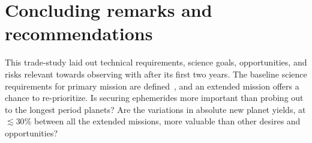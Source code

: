 \section{Concluding remarks and recommendations}
\label{sec:conclusions}

This trade-study laid out technical requirements, science goals, opportunities, and risks relevant towards observing with \tess after its first two years.
The baseline science requirements for \tesss primary mission are defined~\citep{ricker_transiting_2014}, and an extended mission offers a chance to re-prioritize.
Is securing \tesss ephemerides more important than probing out to the longest period planets? 
Are the variations in absolute new planet yields, at $\lesssim30\%$ between all the extended missions, more valuable than other desires and opportunities?



